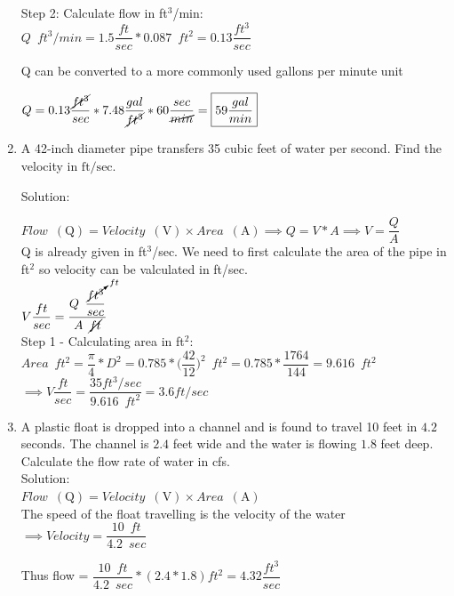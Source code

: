 \documentclass{article}
\begin{document}
\begin{enumerate}
Step 2: Calculate flow in ft$^3$/min:\\

$ Q \enspace ft^3/min = 1.5 \dfrac{ft}{sec}*0.087 \enspace ft^2 = 0.13 \dfrac{ft^3}{sec}$\\

\vspace{0.2cm}

Q can be converted to a more commonly used gallons per minute unit

\vspace{0.2cm}

$Q=0.13 \dfrac{\cancel{ft^3}}{sec}*7.48\dfrac{gal}{\cancel{ft^3}}*60\dfrac{sec}{\cancel{min}}=\boxed{59 \dfrac{gal}{min}}$
  \item A 42-inch diameter pipe transfers 35 cubic feet of water per second. Find the velocity in $\mathrm{ft} / \mathrm{sec}$. 

  Solution:\\
\vspace{0.2cm}

$Flow \enspace(\mathrm{Q})= Velocity \enspace(\mathrm{V})  \times Area \enspace(\mathrm{A}) \implies Q=V*A \implies V=\dfrac{Q}{A}$\\
Q is already given in ft${^3}$/sec.  We need to first calculate the area of the pipe in ft${^2}$ so velocity can be valculated in ft/sec.\\
\vspace{0.2cm}
$ V \dfrac{ft}{sec} = \dfrac{Q \enspace \dfrac{\cancelto{ft}{ft^3}}{sec}}{A \enspace\cancel{ft}}$\\
\vspace{0.2cm}
Step 1 - Calculating area in ft${^2}$:\\
\vspace{0.2cm}
$Area \enspace ft^2= \dfrac{\pi}{4}*D^2= 0.785*\Big(\dfrac{42}{12}\Big)^2 \enspace ft^2=0.785*\dfrac{1764}{144}=9.616 \enspace ft^2$\\
\vspace{0.2cm}
$\implies V \dfrac{ft}{sec} = \dfrac{ 35 ft^3/sec}{9.616 \enspace ft^2} = \boxed{3.6 ft/sec}$\\
\vspace{0.3cm} 

  
  \item A plastic float is dropped into a channel and is found to travel 10 feet in $4.2$ seconds. The channel is $2.4$ feet wide and the water is flowing $1.8$ feet deep. Calculate the flow rate of water in cfs.\\
  \vspace{0.2cm}
  Solution:\\
  $Flow \enspace(\mathrm{Q})= Velocity \enspace(\mathrm{V})  \times Area \enspace(\mathrm{A})$\\

The speed of the float travelling is the velocity of the water $\implies Velocity = \dfrac{10 \enspace ft}{4.2 \enspace sec}$

Thus flow = $\dfrac{10 \enspace ft}{4.2 \enspace sec} * (2.4*1.8) ft^2 = \boxed{4.32 \dfrac{ft^3}{sec}} $\\

\vspace{0.2cm}

\end{enumerate}
\end{document}
